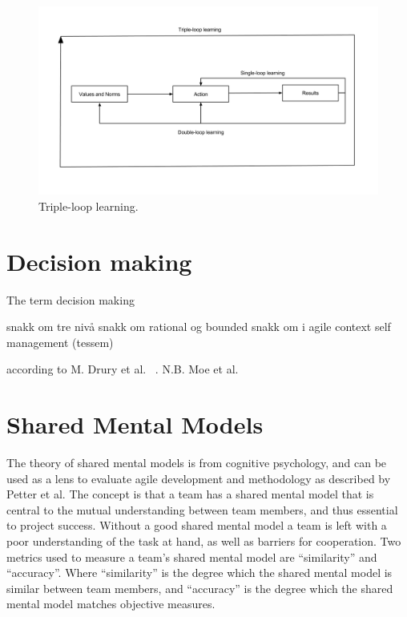 \begin{figure}[!h]
	\centering
	\includegraphics[width=\textwidth, keepaspectratio]{figures/triple-loop.png}
	\caption{Triple-loop learning.}
	\label{figure:triple-loop}
\end{figure}

\clearpage

\section{Decision making}
The term decision making 

snakk om tre nivå
snakk om rational og bounded
snakk om i agile context
self management (tessem)

\clearpage



according to M. Drury et al. ~\cite{Drury2012}. N.B. Moe et al. ~\cite{Moe2011}

\section{Shared Mental Models}
\label{section:mental-models}
The theory of shared mental models is from cognitive psychology, and can be used as a lens to evaluate agile development and methodology as described by Petter et al\cite{Petter2013}. The concept is that a team has a shared mental model that is central to the mutual understanding between team members, and thus essential to project success. Without a good shared mental model a team is left with a poor understanding of the task at hand, as well as barriers for cooperation. Two metrics used to measure a team's shared mental model are ``similarity'' and ``accuracy''. Where ``similarity'' is the degree which the shared mental model is similar between team members, and ``accuracy'' is the degree which the shared mental model matches objective measures. 


